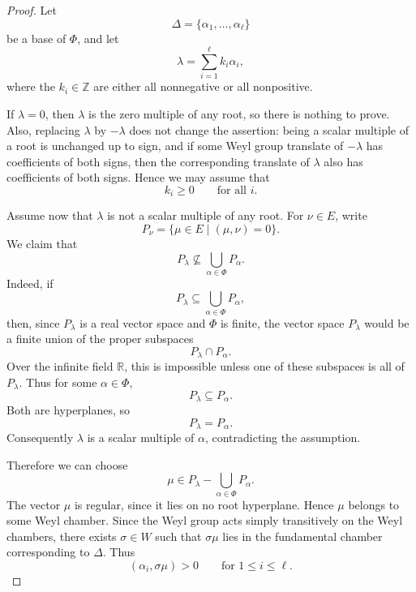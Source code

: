 \begin{proof}
    Let
    \[
        \Delta=\{\alpha_1,\ldots,\alpha_\ell\}
    \]
    be a base of \(\Phi\), and let
    \[
        \lambda=\sum_{i=1}^{\ell}k_i\alpha_i,
    \]
    where the \(k_i\in\mathbb Z\) are either all nonnegative or all nonpositive.
    
    If \(\lambda=0\), then \(\lambda\) is the zero multiple of any root, so there is
    nothing to prove. Also, replacing \(\lambda\) by \(-\lambda\) does not change
    the assertion: being a scalar multiple of a root is unchanged up to sign, and
    if some Weyl group translate of \(-\lambda\) has coefficients of both signs,
    then the corresponding translate of \(\lambda\) also has coefficients of both
    signs. Hence we may assume that
    \[
        k_i\geq 0
        \qquad
        \text{for all }i.
    \]
    
    Assume now that \(\lambda\) is not a scalar multiple of any root. For
    \(\nu\in E\), write
    \[
        P_\nu=\{\mu\in E\mid (\mu,\nu)=0\}.
    \]
    We claim that
    \[
        P_\lambda\not\subseteq \bigcup_{\alpha\in\Phi}P_\alpha.
    \]
    Indeed, if
    \[
        P_\lambda\subseteq \bigcup_{\alpha\in\Phi}P_\alpha,
    \]
    then, since \(P_\lambda\) is a real vector space and \(\Phi\) is finite, the vector
    space \(P_\lambda\) would be a finite union of the proper subspaces
    \[
        P_\lambda\cap P_\alpha.
    \]
    Over the infinite field \(\mathbb R\), this is impossible unless one of these
    subspaces is all of \(P_\lambda\). Thus for some \(\alpha\in\Phi\),
    \[
        P_\lambda\subseteq P_\alpha.
    \]
    Both are hyperplanes, so
    \[
        P_\lambda=P_\alpha.
    \]
    Consequently \(\lambda\) is a scalar multiple of \(\alpha\), contradicting the
    assumption.
    
    Therefore we can choose
    \[
        \mu\in P_\lambda-\bigcup_{\alpha\in\Phi}P_\alpha.
    \]
    The vector \(\mu\) is regular, since it lies on no root hyperplane. Hence \(\mu\)
    belongs to some Weyl chamber. Since the Weyl group acts simply transitively
    on the Weyl chambers, there exists \(\sigma\in W\) such that \(\sigma\mu\)
    lies in the fundamental chamber corresponding to \(\Delta\). Thus
    \[
        (\alpha_i,\sigma\mu)>0
        \qquad
        \text{for }1\leq i\leq \ell.
    \]
    

\end{proof}
